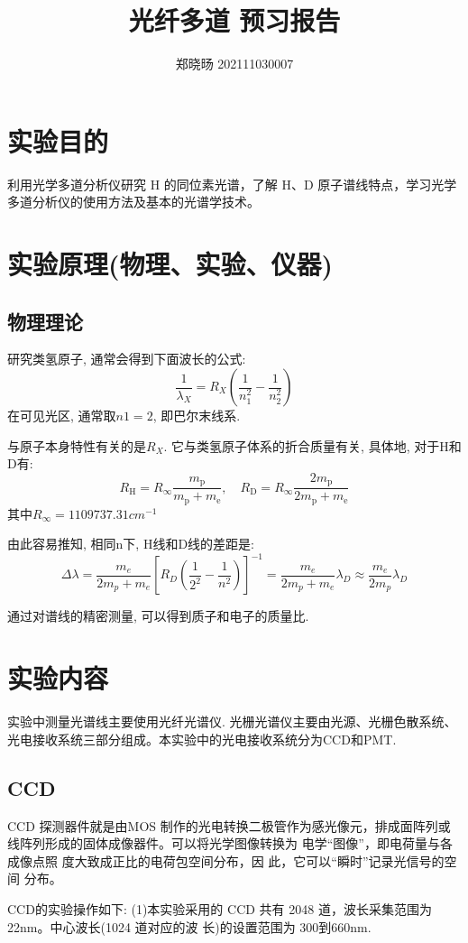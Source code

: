 \documentclass[12pt,a4paper]{article}
\title{\vspace{-4cm}\Large 光纤多道 预习报告}  %
\author{\kaishu 郑晓旸 202111030007}   %
\date{}
\begin{document}
\maketitle
\section{实验目的}
利用光学多道分析仪研究 H 的同位素光谱，了解 H、D 原子谱线特点，学习光学多道分析仪的使用方法及基本的光谱学技术。

\section{实验原理(物理、实验、仪器)}
\subsection{物理理论}
研究类氢原子, 通常会得到下面波长的公式:
$$\frac{1}{\lambda_{X}}=R_{X}\left(\frac{1}{n_{1}^{2}}-\frac{1}{n_{2}^{2}}\right)$$
在可见光区, 通常取$n1=2$, 即巴尔末线系. 

与原子本身特性有关的是$R_{X}$. 它与类氢原子体系的折合质量有关, 具体地, 对于H和D有: 
$$R_{\mathrm{H}}=R_{\infty} \frac{m_{\mathrm{p}}}{m_{\mathrm{p}}+m_{\mathrm{e}}}, \quad R_{\mathrm{D}}=R_{\infty} \frac{2 m_{\mathrm{p}}}{2 m_{\mathrm{p}}+m_{\mathrm{e}}}$$
其中$R_{\infty}=1109737.31cm^{-1}$

由此容易推知, 相同n下, H线和D线的差距是: 
$$\Delta \lambda=\frac{m_{e}}{2 m_{p}+m_{e}}\left[R_{D}\left(\frac{1}{2^{2}}-\frac{1}{n^{2}}\right)\right]^{-1}=\frac{m_{e}}{2 m_{p}+m_{e}} \lambda_{D}\approx \frac{m_e}{2m_p} \lambda_{D}$$

通过对谱线的精密测量, 可以得到质子和电子的质量比. 
\section{实验内容}
实验中测量光谱线主要使用光纤光谱仪. 光栅光谱仪主要由光源、光栅色散系统、光电接收系统三部分组成。本实验中的光电接收系统分为CCD和PMT. 

\subsection{CCD}
CCD 探测器件就是由MOS
制作的光电转换二极管作为感光像元，排成面阵列或线阵列形成的固体成像器件。可以将光学图像转换为
电学“图像”，即电荷量与各成像点照
度大致成正比的电荷包空间分布，因
此，它可以“瞬时”记录光信号的空间
分布。

CCD的实验操作如下: 
(1)本实验采用的 CCD 共有 2048 道，波长采集范围为 22nm。中心波长(1024 道对应的波
长)的设置范围为 300到660nm.
\end{document}
